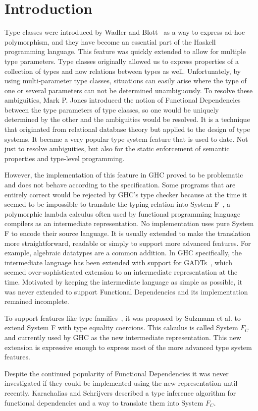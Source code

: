 \chapter{Introduction}
\label{cha:intro}
Type classes were introduced by Wadler and Blott~\cite{Wadler:1989:MAP:75277.75283}
as a
way to express ad-hoc polymorphism, and they have become an essential part of the Haskell
programming language. This feature was quickly extended to allow for multiple
type parameters. Type classes originally allowed us to express properties of a
collection of types and now relations between types as well. Unfortunately, by using
multi-parameter type classes, situations can easily arise where the type
of one or several parameters can not be determined unambiguously. To resolve
these ambiguities, Mark P. Jones introduced the notion of Functional Dependencies
\cite{Jones00typeclasses} between the type parameters of type classes, so one
would be uniquely determined by the other and the ambiguities would be resolved.
It is a technique that originated from relational database theory but applied to
the design of type systems. It became a very popular type system feature that is
used to date. Not just to resolve ambiguities, but also for the
static enforcement of semantic properties and type-level programming.

However, the implementation of this feature in GHC proved to be problematic and
does not behave according to the specification.  Some programs that are entirely
correct
would be rejected by GHC's type checker because at the time it seemed to be
impossible to translate the typing relation into System
F~\cite{systemf},
a polymorphic
lambda calculus often used by functional programming language compilers as an
intermediate representation. No implementation uses pure System F to encode
their source language. It is usually extended to make the translation more
straightforward, readable or simply to support more advanced features. For
example, algebraic datatypes are a common addition. In GHC specifically, the intermediate language has been extended
with support for GADTs~\cite{PeytonJones06}, which seemed over-sophisticated extension to an
intermediate representation at the time. Motivated by
keeping the intermediate language as simple as possible, it was never extended
to support Functional Dependencies and its implementation remained incomplete.

To support features like type
families~\cite{AssociatedTypeSynonyms}, it was proposed by
Sulzmann et al. \cite{Sulzmann:2007:SFT:1190315.1190324} to extend System F with
type equality coercions. This calculus is called System $F_C$ and currently used by
GHC as the new intermediate representation. This new extension is expressive
enough to express most of the more advanced type system features.

Despite the continued popularity of Functional Dependencies it was never
investigated if they could be implemented using the new representation until
recently. Karachalias and Schrijvers \cite{Karachalias:2017:EFD:3156695.3122966}
described a type inference algorithm for functional dependencies and a way to
translate them into System $F_C$.
